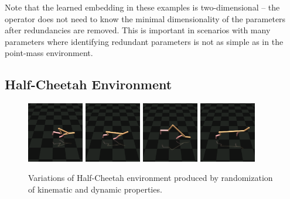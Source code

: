 \documentclass{article}
\begin{document}
Note that the learned embedding in these examples is two-dimensional -- 
the operator does not need to know the minimal dimensionality of the parameters after redundancies are removed.
This is important in scenarios with many parameters where identifying redundant parameters 
is not as simple as in the point-mass environment.

\subsection{Half-Cheetah Environment}

\begin{figure}[h]
\includegraphics[trim=4cm 3cm 0cm 4cm, clip, width=0.22\textwidth]{cheetah_short.png}\hfill
\includegraphics[trim=4cm 3cm 0cm 4cm, clip, width=0.22\textwidth]{cheetah_medium.png}\hfill
\includegraphics[trim=4cm 3cm 0cm 4cm, clip, width=0.22\textwidth]{cheetah_backleg.png}\hfill
\includegraphics[trim=4cm 3cm 0cm 4cm, clip, width=0.22\textwidth]{cheetah_long.png}
\caption{Variations of Half-Cheetah environment produced by randomization of kinematic and dynamic properties.}
\label{cheetahs}
\end{figure}
\end{document}
